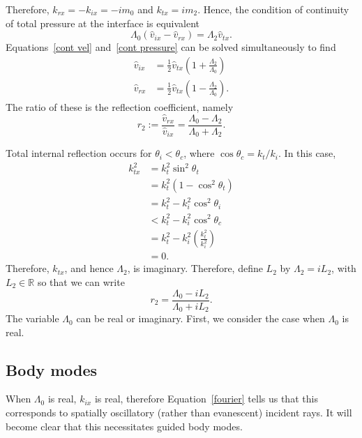 	Therefore, $k_{rx} = -k_{ix} = -im_0$ and $k_{tx} = im_2$. Hence, the condition of continuity of total pressure at the interface is equivalent
	\begin{equation}
	\Lambda_0(\widehat{v}_{ix} - \widehat{v}_{rx}) = \Lambda_2 \widehat{v}_{tx}. \label{cont pressure}
	\end{equation}
	Equations~\eqref{cont vel} and~\eqref{cont pressure} can be solved simultaneously to find
	\begin{align}
	\widehat{v}_{ix} &= \frac{1}{2}\widehat{v}_{tx}\left(1 + \frac{\Lambda_2}{\Lambda_0}\right) \\
	\widehat{v}_{rx} &= \frac{1}{2}\widehat{v}_{tx}\left(1 - \frac{\Lambda_2}{\Lambda_0}\right).
	\end{align}
	The ratio of these is the reflection coefficient, namely
	\begin{equation}
	r_2 := \frac{\widehat{v}_{rx}}{\widehat{v}_{ix}} = \frac{\Lambda_0 - \Lambda_2}{\Lambda_0 + \Lambda_2}. \label{reflection coefficient}
	\end{equation}
	
	Total internal reflection occurs for $\theta_i < \theta_c$, where $\cos{\theta_c} = k_t / k_i$. In this case,
	\begin{align}
	k_{tx}^2 &= k_t^2 \sin^2{\theta_t} \\
	&= k_t^2(1 - \cos^2{\theta_t}) \\
	&= k_t^2 - k_i^2\cos^2{\theta_i} \\
	&< k_t^2 - k_i^2\cos^2{\theta_c} \\
	&= k_t^2 - k_i^2 \left(\frac{k_t^2}{k_i^2}\right) \\
	&= 0.
	\end{align}
	Therefore, $k_{tx}$, and hence $\Lambda_2$, is imaginary. Therefore, define $L_2$ by $\Lambda_2 = i L_2$, with $L_2 \in \mathbb{R}$ so that we can write
	\begin{equation}
	r_2 = \frac{\Lambda_0 - iL_2}{\Lambda_0 + iL_2}. \label{reflection coefficient 2}
	\end{equation}
	The variable $\Lambda_0$ can be real or imaginary. First, we consider the case when $\Lambda_0$ is real.
	
	
	\subsection{Body modes}
	When $\Lambda_0$ is real, $k_{ix}$ is real, therefore Equation~\eqref{fourier} tells us that this corresponds to spatially oscillatory (rather than evanescent) incident rays. It will become clear that this necessitates guided body modes.
	
